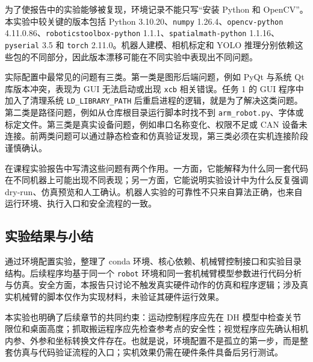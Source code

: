 为了使报告中的实验能够被复现，环境记录不能只写“安装 Python 和 OpenCV”。本实验中较关键的版本包括 Python 3.10.20、\texttt{numpy} 1.26.4、\texttt{opencv-python} 4.11.0.86、\texttt{roboticstoolbox-python} 1.1.1、\texttt{spatialmath-python} 1.1.16、\texttt{pyserial} 3.5 和 \texttt{torch} 2.11.0。机器人建模、相机标定和 YOLO 推理分别依赖这些包的不同部分，因此版本漂移可能在不同实验中表现出不同问题。

实际配置中最常见的问题有三类。第一类是图形后端问题，例如 PyQt 与系统 Qt 库版本冲突，表现为 GUI 无法启动或出现 \texttt{xcb} 相关错误。任务 1 的 GUI 程序中加入了清理系统 \texttt{LD\_LIBRARY\_PATH} 后重启进程的逻辑，就是为了解决这类问题。第二类是路径问题，例如从仓库根目录运行脚本时找不到 \texttt{arm\_robot.py}、字体或标定文件。第三类是真实设备问题，例如串口名称变化、权限不足或 CAN 设备未连接。前两类问题可以通过静态检查和仿真验证发现，第三类必须在实机连接阶段谨慎确认。

在课程实验报告中写清这些问题有两个作用。一方面，它能解释为什么同一套代码在不同机器上可能出现不同表现；另一方面，它能说明实验设计中为什么反复强调 dry-run、仿真预览和人工确认。机器人实验的可靠性不只来自算法正确，也来自运行环境、执行入口和安全流程的一致。

\subsection{实验结果与小结}

通过环境配置实验，整理了 conda 环境、核心依赖、机械臂控制接口和实验目录结构。后续程序均基于同一个 \texttt{robot} 环境和同一套机械臂模型参数进行代码分析与仿真。安全方面，本报告只讨论不触发真实硬件动作的仿真和程序逻辑；涉及真实机械臂的脚本仅作为实现材料，未验证其硬件运行效果。

本实验也明确了后续章节的共同约束：运动控制程序应先在 DH 模型中检查关节限位和桌面高度；抓取搬运程序应先检查参考点的安全性；视觉程序应先确认相机内参、外参和坐标转换文件存在。也就是说，环境配置不是孤立的第一步，而是整套仿真与代码验证流程的入口；实机效果仍需在硬件条件具备后另行测试。
